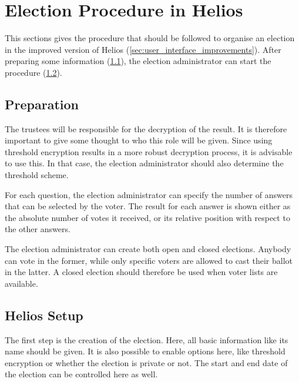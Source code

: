 % 
%

\section{Election Procedure in Helios}
\label{sec:procedure}

This sections gives the procedure that should be followed to organise an election in the improved version of Helios (\ref{sec:user_interface_improvements}). After preparing some information (\ref{sec:proc:preparation}), the election administrator can start the procedure (\ref{sec:proc:helios}).

\subsection{Preparation}
\label{sec:proc:preparation}

The trustees will be responsible for the decryption of the result. It is therefore important to give some thought to who this role will be given. Since using threshold encryption results in a more robust decryption process, it is advisable to use this. In that case, the election administrator should also determine the threshold scheme.

\par For each question, the election administrator can specify the number of answers that can be selected by the voter. The result for each answer is shown either as the absolute number of votes it received, or its relative position with respect to the other answers.

\par The election administrator can create both open and closed elections. Anybody can vote in the former, while only specific voters are allowed to cast their ballot in the latter. A closed election should therefore be used when voter lists are available.

\subsection{Helios Setup}
\label{sec:proc:helios}

The first step is the creation of the election. Here, all basic information like its name should be given. It is also possible to enable options here, like threshold encryption or whether the election is private or not. The start and end date of the election can be controlled here as well.

